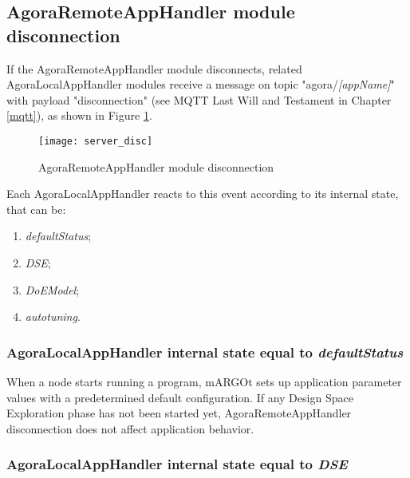 \subsection{AgoraRemoteAppHandler module disconnection}\label{handler_disc}

If the AgoraRemoteAppHandler module disconnects, related Agora\-Local\-App\-Handler modules receive a message on topic "agora\slash{}\textit{[appName]}" with payload "disconnection" (see MQTT Last Will and Testament in Chapter \ref{mqtt}), as shown in Figure \ref{fig::remDisc}.

\begin{figure}[htb]

    \centering
    \texttt{[image: server\_disc]}
    \caption{AgoraRemoteAppHandler module disconnection}

    \label{fig::remDisc}
    
\end{figure}

Each AgoraLocalAppHandler reacts to this event according to its internal state, that can be:

\begin{enumerate}

    \item \textit{defaultStatus};
    
    \item \textit{DSE};
    
    \item \textit{DoEModel};
    
    \item \textit{autotuning}.

\end{enumerate}


\subsubsection{AgoraLocalAppHandler internal state equal to \textit{defaultStatus}}

When a node starts running a program, mARGOt sets up application parameter values with a predetermined default configuration. If any Design Space Exploration phase has not been started yet, AgoraRemoteAppHandler disconnection does not affect application behavior.


\subsubsection{AgoraLocalAppHandler internal state equal to \textit{DSE}}

